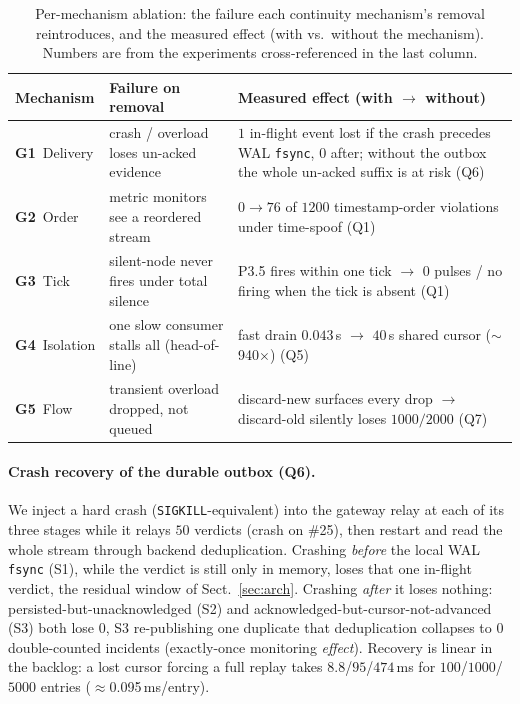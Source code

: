 \documentclass[runningheads]{llncs}
\begin{document}
\begin{table}[t]
\centering
\caption{Per-mechanism ablation: the failure each continuity mechanism's removal
reintroduces, and the measured effect (with vs.\ without the mechanism). Numbers are
from the experiments cross-referenced in the last column.}
\label{tab:ablation}
\footnotesize
\setlength{\tabcolsep}{4pt}
\begin{tabular}{@{}R{2.0cm}R{4.1cm}R{4.6cm}@{}}
\toprule
\textbf{Mechanism} & \textbf{Failure on removal} & \textbf{Measured effect (with $\to$ without)} \\
\midrule
\textbf{G1}~Delivery & crash / overload loses un-acked evidence & $1$ in-flight event lost if the crash precedes WAL \texttt{fsync}, $0$ after; without the outbox the whole un-acked suffix is at risk (Q6) \\
\textbf{G2}~Order & metric monitors see a reordered stream & $0\to76$ of $1200$ timestamp-order violations under time-spoof (Q1) \\
\textbf{G3}~Tick & silent-node never fires under total silence & P3.5 fires within one tick $\to$ $0$ pulses / no firing when the tick is absent (Q1) \\
\textbf{G4}~Isolation & one slow consumer stalls all (head-of-line) & fast drain $0.043$\,s $\to$ $40$\,s shared cursor ($\sim$940$\times$) (Q5) \\
\textbf{G5}~Flow & transient overload dropped, not queued & discard-new surfaces every drop $\to$ discard-old silently loses $1000/2000$ (Q7) \\
\bottomrule
\end{tabular}
\end{table}

\paragraph{Crash recovery of the durable outbox (Q6).}
We inject a hard crash (\texttt{SIGKILL}-equivalent) into the gateway relay at each of
its three stages while it relays $50$ verdicts (crash on \#25), then restart and read the
whole stream through backend deduplication. Crashing \emph{before} the local WAL
\texttt{fsync} (S1), while the verdict is still only in memory, loses that one in-flight
verdict, the residual window of Sect.~\ref{sec:arch}. Crashing \emph{after} it loses
nothing: persisted-but-unacknowledged (S2) and acknowledged-but-cursor-not-advanced (S3)
both lose $0$, S3 re-publishing one duplicate that deduplication collapses to $0$
double-counted incidents (exactly-once monitoring \emph{effect}).
Recovery is linear in the backlog: a lost cursor forcing a full replay takes
$8.8$/$95$/$474$\,ms for $100$/$1000$/$5000$ entries ($\approx$0.095\,ms/entry).
\end{document}
